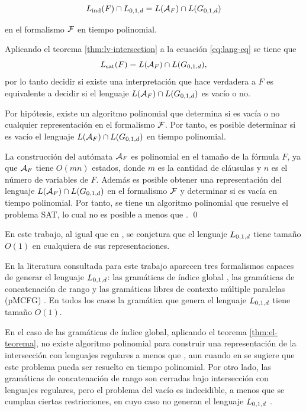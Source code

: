 \begin{equation}
    \label{eq:lang-eq}
    L_{\mathrm{ind}}(F) \cap L_{0,1,d} = L(\mathcal{A}_{F}) \cap L(G_{0, 1, d})
\end{equation}

en el formalismo $\mathcal{F}$ en tiempo polinomial.

Aplicando el teorema \ref{thm:lv-intersection} a la ecuación \ref{eq:lang-eq} se tiene que
$$
    L_{\mathrm{sat}}(F) = L(\mathcal{A}_{F}) \cap L(G_{0, 1, d}),
$$
por lo tanto decidir si existe una interpretación que hace verdadera a $F$ es equivalente a decidir si el lenguaje $L(\mathcal{A}_{F}) \cap L(G_{0, 1, d})$ es vacío o no.

Por hipótesis, existe un algoritmo polinomial que determina si es vacía o no cualquier representación en el formalismo $\mathcal{F}$. Por tanto, es posible determinar si es vacío el lenguaje $L(\mathcal{A}_{F}) \cap L(G_{0, 1, d})$ en tiempo polinomial.

La construcción del autómata $\mathcal{A}_{F}$ es polinomial en el tamaño de la fórmula $F$, ya que $\mathcal{A}_{F}$ tiene $O(mn)$ estados, donde $m$ es la cantidad de cláusulas y $n$ es el número de variables de $F$. Además es posible obtener una representación del lenguaje $L(\mathcal{A}_{F}) \cap L(G_{0, 1, d})$ en el formalismo $\mathcal{F}$ y determinar si es vacía en tiempo polinomial. Por tanto, se tiene un algoritmo polinomial que resuelve el problema SAT, lo cual no es posible a menos que \pnp. \qed

En este trabajo, al igual que en \cite{RCGSAT}, se conjetura que el lenguaje $L_{0,1,d}$ tiene tamaño $O(1)$ en cualquiera de sus representaciones.

En la literatura consultada para este trabajo aparecen tres formalismos capaces de generar el lenguaje $L_{0,1,d}$: las gramáticas de índice global \cite{globalIndexLanguages}, las gramáticas de concatenación de rango \cite{propertiesRCGBib} y las gramáticas libres de contexto múltiple paralelas (pMCFG) \cite{Seki1991OnMC}. En todos los casos la gramática que genera el lenguaje $L_{0,1,d}$ tiene tamaño $O(1)$.


En el caso de las gramáticas de índice global, aplicando el teorema \ref{thm:el-teorema}, no existe algoritmo polinomial para construir una representación de la intersección con lenguajes regulares a menos que \pnp, aun cuando en \cite{globalIndexLanguages} se sugiere que este problema pueda ser resuelto en tiempo polinomial. Por otro lado, las gramáticas de concatenación de rango son cerradas bajo intersección con lenguajes regulares, pero el problema del vacío es indecidible, a menos que se cumplan ciertas restricciones, en cuyo caso no generan el lenguaje $L_{0,1,d}$ \cite{propertiesRCGBib}.

